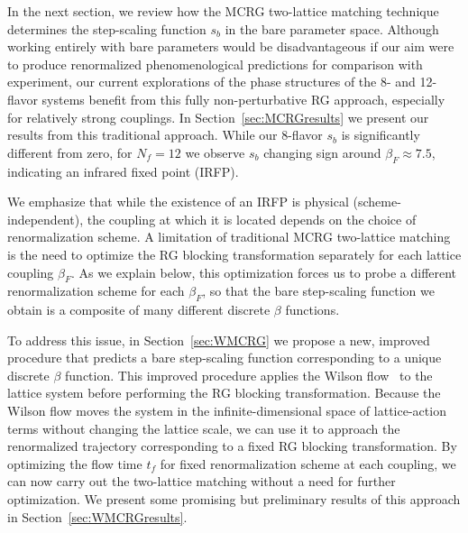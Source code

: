 \documentclass{PoS}
\newcommand{\be}{\ensuremath{\beta} }
\newcommand{\secref}[1]{Section~\ref{#1}}
\begin{document}
In the next section, we review how the MCRG two-lattice matching technique determines the step-scaling function $s_b$ in the bare parameter space.
Although working entirely with bare parameters would be disadvantageous if our aim were to produce renormalized phenomenological predictions for comparison with experiment, our current explorations of the phase structures of the 8- and 12-flavor systems benefit from this fully non-perturbative RG approach, especially for relatively strong couplings.
In \secref{sec:MCRGresults} we present our results from this traditional approach.
While our 8-flavor $s_b$ is significantly different from zero, for $N_f = 12$ we observe $s_b$ changing sign around $\be_F \approx 7.5$, indicating an infrared fixed point (IRFP).

We emphasize that while the existence of an IRFP is physical (scheme-independent), the coupling at which it is located depends on the choice of renormalization scheme.
A limitation of traditional MCRG two-lattice matching is the need to optimize the RG blocking transformation separately for each lattice coupling $\be_F$.
As we explain below, this optimization forces us to probe a different renormalization scheme for each $\be_F$, so that the bare step-scaling function we obtain is a composite of many different discrete \be functions.

To address this issue, in \secref{sec:WMCRG} we propose a new, improved procedure that predicts a bare step-scaling function corresponding to a unique discrete \be function.
This improved procedure applies the Wilson flow~\cite{Narayanan:2006rf, Luscher:2010iy} to the lattice system before performing the RG blocking transformation.
Because the Wilson flow moves the system in the infinite-dimensional space of lattice-action terms without changing the lattice scale, we can use it to approach the renormalized trajectory corresponding to a fixed RG blocking transformation.
By optimizing the flow time $t_f$ for fixed renormalization scheme at each coupling, we can now carry out the two-lattice matching without a need for further optimization.
We present some promising but preliminary results of this approach in \secref{sec:WMCRGresults}.



\end{document}
